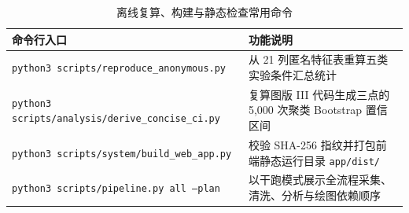 \begin{table}[H]
\centering
\caption{离线复算、构建与静态检查常用命令}\label{tab:repro-cmds}
\ReportTableStyle
\begin{tabularx}{\linewidth}{@{}>{\raggedright\arraybackslash}p{6.2cm} >{\raggedright\arraybackslash}X@{}}
\toprule
\textbf{命令行入口} & \textbf{功能说明} \\
\midrule
\texttt{python3 scripts/reproduce\_anonymous.py} & 从 21 列匿名特征表重算五类实验条件汇总统计 \\
\texttt{python3 scripts/analysis/\newline derive\_concise\_ci.py} & 复算图版 III 代码生成三点的 5,000 次聚类 Bootstrap 置信区间 \\
\texttt{python3 scripts/system/\newline build\_web\_app.py} & 校验 SHA-256 指纹并打包前端静态运行目录 \texttt{app/dist/} \\
\texttt{python3 scripts/pipeline.py all --plan} & 以干跑模式展示全流程采集、清洗、分析与绘图依赖顺序 \\
\bottomrule
\end{tabularx}
\end{table}
